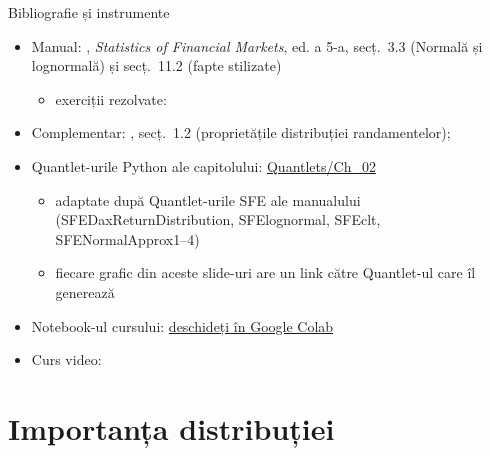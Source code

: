 \begin{frame}{Bibliografie și instrumente}
\itemsize{\small}
\begin{itemize}
    \item Manual: , \textit{Statistics of Financial Markets}, ed. a 5-a, secț.~3.3 (Normală și lognormală) și secț.~11.2 (fapte stilizate)
    \begin{itemize}
        \item exerciții rezolvate: 
    \end{itemize}
    \item Complementar: , secț.~1.2 (proprietățile distribuției randamentelor); 
    \item Quantlet-urile Python ale capitolului: \href{https://github.com/danpele/SFM/tree/main/Quantlets/Ch_02}{Quantlets/Ch\_02}
    \begin{itemize}
        \item adaptate după Quantlet-urile SFE ale manualului (SFEDaxReturnDistribution, SFElognormal, SFEclt, SFENormalApprox1--4)
        \item fiecare grafic din aceste slide-uri are un link către Quantlet-ul care îl generează
    \end{itemize}
    \item Notebook-ul cursului: \href{\colaburl{notebooks/EN/chapter2_lecture_notebook.ipynb}}{deschideți în Google Colab}
    \item Curs video: 
\end{itemize}
\end{frame}


\section{Importanța distribuției}

